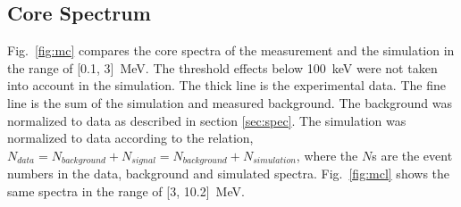 \documentclass{elsart}
\begin{document}
\subsection{Core Spectrum}
\label{sec:spemc}
Fig.~\ref{fig:mc} compares the core spectra of the measurement and the
simulation in the range of [0.1, 3]~MeV. The threshold effects below
100~keV were not taken into account in the simulation. The thick line
is the experimental data. The fine line is the sum of the simulation
and measured background. The background was normalized to data as
described in section \ref{sec:spec}. The simulation was normalized to
data according to the relation, $N_{data} = N_{background} +
N_{signal} = N_{background} + N_{simulation}$, where the $N$s are the
event numbers in the data, background and simulated
spectra. Fig.~\ref{fig:mcl} shows the same spectra in the range of
[3, 10.2]~MeV.
\end{document}
